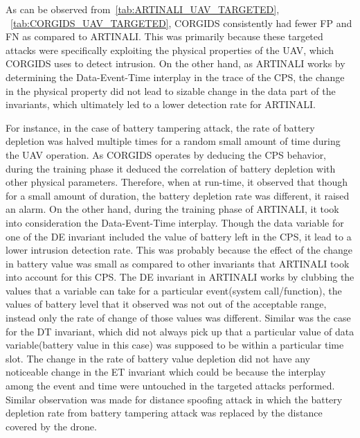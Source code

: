 As can be observed from~\autoref{tab:ARTINALI_UAV_TARGETED}, ~\autoref{tab:CORGIDS_UAV_TARGETED}, \ac{CORGIDS} consistently had fewer \ac{FP} and \ac{FN} as compared to ARTINALI. This was primarily because these targeted attacks were specifically exploiting the physical properties of the \ac{UAV}, which \ac{CORGIDS} uses to detect intrusion. On the other hand, as ARTINALI works by determining the Data-Event-Time interplay in the trace of the \ac{CPS}, the change in the physical property did not lead to sizable change in the data part of the invariants, which ultimately led to a lower detection rate for ARTINALI.

For instance, in the case of battery tampering attack, the rate of battery depletion was halved multiple times for a random small amount of time during the \ac{UAV} operation. As \ac{CORGIDS} operates by deducing the \ac{CPS} behavior, during the training phase it deduced the correlation of battery depletion with other physical parameters. Therefore, when at run-time, it observed that though for a small amount of duration, the battery depletion rate was different, it raised an alarm. On the other hand, during the training phase of ARTINALI, it took into consideration the Data-Event-Time interplay. Though the data variable for one of the D\textbar E invariant included the value of battery left in the \ac{CPS}, it lead to a lower intrusion detection rate. This was probably because the effect of the change in battery value was small as compared to other invariants that ARTINALI took into account for this \ac{CPS}. The D\textbar E invariant in ARTINALI works by clubbing the values that a variable can take for a particular event(system call/function), the values of battery level that it observed was not out of the acceptable range, instead only the rate of change of those values was different. Similar was the case for the D\textbar T invariant, which did not always pick up that a particular value of data variable(battery value in this case) was supposed to be within a particular time slot. The change in the rate of battery value depletion did not have any noticeable change in the E\textbar T invariant which could be because the interplay among the event and time were untouched in the targeted attacks performed. Similar observation was made for distance spoofing attack in which the battery depletion rate from battery tampering attack was replaced by the distance covered by the drone.

